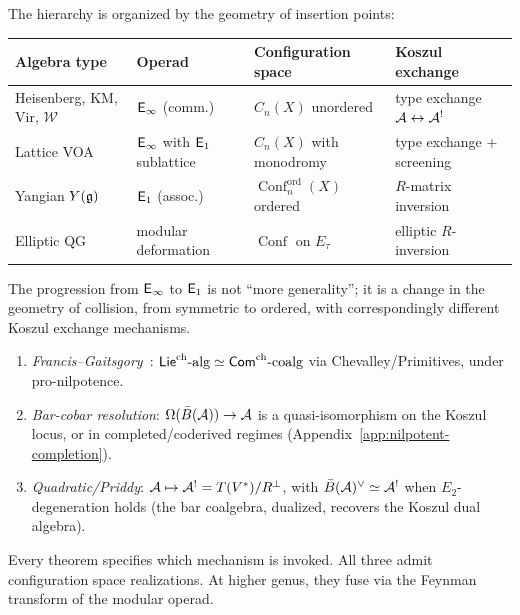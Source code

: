 \begin{remark}
\label{rem:operadic-hierarchy-table}
The hierarchy is organized by the geometry of insertion points:
\begin{center}
\small
\begin{tabular}{llll}
\textbf{Algebra type} & \textbf{Operad} &
  \textbf{Configuration space} & \textbf{Koszul exchange} \\ \hline
Heisenberg, KM, Vir, $\mathcal{W}$
  & $\mathsf{E}_{\infty}$ (comm.)
  & $C_n(X)$ unordered
  & type exchange $\mathcal{A} \leftrightarrow \mathcal{A}^!$ \\[2pt]
Lattice VOA
  & $\mathsf{E}_{\infty}$ with $\mathsf{E}_1$ sublattice
  & $C_n(X)$ with monodromy
  & type exchange + screening \\[2pt]
Yangian $Y(\mathfrak{g})$
  & $\mathsf{E}_1$ (assoc.)
  & $\operatorname{Conf}_n^{\mathrm{ord}}(X)$ ordered
  & $R$-matrix inversion \\[2pt]
Elliptic QG
  & modular deformation
  & $\operatorname{Conf}$ on $E_\tau$
  & elliptic $R$-inversion
\end{tabular}
\end{center}
The progression from $\mathsf{E}_{\infty}$ to $\mathsf{E}_1$ is not ``more
generality''; it is a change in the geometry of collision, from
symmetric to ordered, with correspondingly different Koszul
exchange mechanisms.
\end{remark}

\begin{remark}
\label{rem:three-koszul-mechanisms}
\begin{enumerate}[label=(\roman*)]
\item \emph{Francis--Gaitsgory}~\cite{FG12}:
  $\mathsf{Lie}^{\mathrm{ch}}\text{-alg} \simeq \mathsf{Com}^{\mathrm{ch}}\text{-coalg}$ via
  Chevalley/Primitives, under pro-nilpotence.
\item \emph{Bar-cobar resolution}: $\Omega(\bar{B}(\mathcal{A})) \to \mathcal{A}$
  is a quasi-isomorphism on the Koszul locus, or in
  completed/coderived regimes
  (Appendix~\ref{app:nilpotent-completion}).
\item \emph{Quadratic/Priddy}:
  $\mathcal{A} \mapsto \mathcal{A}^! = T(V^*)/R^\perp$, with
  $\bar{B}(\mathcal{A})^\vee \simeq \mathcal{A}^!$ when $E_2$-degeneration holds (the bar coalgebra, dualized, recovers the Koszul dual algebra).
\end{enumerate}
Every theorem specifies which mechanism is invoked.  All three
admit configuration space realizations.  At higher genus, they fuse
via the Feynman transform of the modular operad.
\end{remark}

